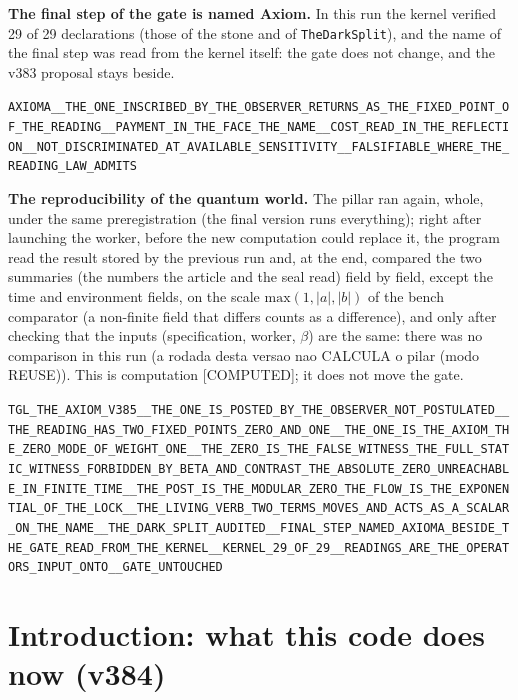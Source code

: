 \documentclass[11pt]{article}
\theoremstyle{definition}\newtheorem{deriv}{Derivation}
\begin{document}
\textbf{The final step of the gate is named Axiom.} In this run the kernel verified 29 of 29 declarations (those of the stone and of \texttt{TheDarkSplit}), and the name of the final step was read from the kernel itself: the gate does not change, and the v383 proposal stays beside.

\begin{center}\small\texttt{AXIOMA\_\_THE\_ONE\_INSCRIBED\_BY\_THE\_OBSERVER\_RETURNS\_AS\_THE\_FIXED\_POINT\_OF\_THE\_READING\_\_PAYMENT\_IN\_THE\_FACE\_THE\_NAME\_\_COST\_READ\_IN\_THE\_REFLECTION\_\_NOT\_DISCRIMINATED\_AT\_AVAILABLE\_SENSITIVITY\_\_FALSIFIABLE\_WHERE\_THE\_READING\_LAW\_ADMITS}\end{center}

\textbf{The reproducibility of the quantum world.} The pillar ran again, whole, under the same preregistration (the final version runs everything); right after launching the worker, before the new computation could replace it, the program read the result stored by the previous run and, at the end, compared the two summaries (the numbers the article and the seal read) field by field, except the time and environment fields, on the scale $\mathrm{max}(1,|a|,|b|)$ of the bench comparator (a non-finite field that differs counts as a difference), and only after checking that the inputs (specification, worker, $\beta$) are the same: there was no comparison in this run (a rodada desta versao nao CALCULA o pilar (modo REUSE)). This is computation \textsf{[COMPUTED]}; it does not move the gate.

\begin{center}\small\texttt{TGL\_THE\_AXIOM\_V385\_\_THE\_ONE\_IS\_POSTED\_BY\_THE\_OBSERVER\_NOT\_POSTULATED\_\_THE\_READING\_HAS\_TWO\_FIXED\_POINTS\_ZERO\_AND\_ONE\_\_THE\_ONE\_IS\_THE\_AXIOM\_THE\_ZERO\_MODE\_OF\_WEIGHT\_ONE\_\_THE\_ZERO\_IS\_THE\_FALSE\_WITNESS\_THE\_FULL\_STATIC\_WITNESS\_FORBIDDEN\_BY\_BETA\_AND\_CONTRAST\_THE\_ABSOLUTE\_ZERO\_UNREACHABLE\_IN\_FINITE\_TIME\_\_THE\_POST\_IS\_THE\_MODULAR\_ZERO\_THE\_FLOW\_IS\_THE\_EXPONENTIAL\_OF\_THE\_LOCK\_\_THE\_LIVING\_VERB\_TWO\_TERMS\_MOVES\_AND\_ACTS\_AS\_A\_SCALAR\_ON\_THE\_NAME\_\_THE\_DARK\_SPLIT\_AUDITED\_\_FINAL\_STEP\_NAMED\_AXIOMA\_BESIDE\_THE\_GATE\_READ\_FROM\_THE\_KERNEL\_\_KERNEL\_29\_OF\_29\_\_READINGS\_ARE\_THE\_OPERATORS\_INPUT\_ONTO\_\_GATE\_UNTOUCHED}\end{center}

\section*{Introduction: what this code does now (v384)}
\end{document}
